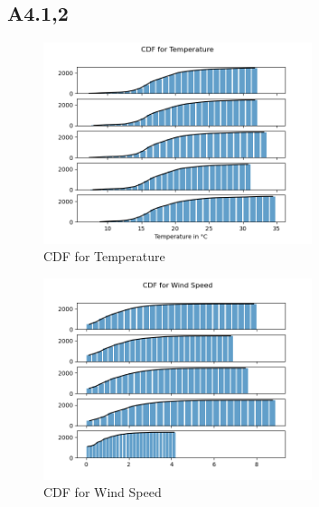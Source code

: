 \documentclass[a4paper,12pt]{article}
\begin{document}
 \subsection{A4.1,2}
   \begin{figure}[H] 
 	\centering
 	\includegraphics[width=0.7\textwidth]{CDF for Temperature.png}
 	\caption{CDF for Temperature\cite{Maiullari2020}}
   \end{figure}
   \begin{figure}[H] 
	\centering
	\includegraphics[width=0.7\textwidth]{CDF for Wind Speed.png}
    \caption{CDF for Wind Speed\cite{Maiullari2020}}
   \end{figure}
\end{document}
